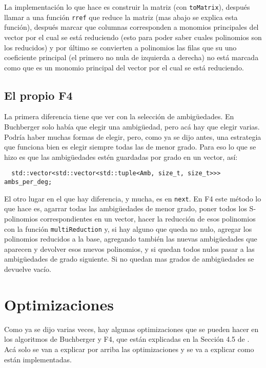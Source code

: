 \documentclass{report}
\theoremstyle{customstyle}
\theoremstyle{factstyle}
\begin{document}
La implementación lo que hace es construir la matriz (con \texttt{toMatrix}), después llamar a una función \texttt{rref} que reduce la matriz (mas abajo se explica esta función), después marcar que columnas corresponden a monomios principales del vector por el cual se está reduciendo (esto para poder saber cuales polinomios son los reducidos) y por último se convierten a polinomios las filas que su uno coeficiente principal (el primero no nula de izquierda a derecha) no está marcada como que es un monomio principal del vector por el cual se está reduciendo.

\subsection{El propio F4}

La primera diferencia tiene que ver con la selección de ambigüedades. En Buchberger solo había que elegir una ambigüedad, pero acá hay que elegir varias. Podría haber muchas formas de elegir, pero, como ya se dijo antes, una estrategia que funciona bien es elegir siempre todas las de menor grado. Para eso lo que se hizo es que las ambigüedades estén guardadas por grado en un vector, así:

\begin{verbatim}
  std::vector<std::vector<std::tuple<Amb, size_t, size_t>>> ambs_per_deg;
\end{verbatim}

El otro lugar en el que hay diferencia, y mucha, es en \texttt{next}. En F4 este método lo que hace es, agarrar todas las ambigüedades de menor grado, poner todos los S-polinomios correspondientes en un vector, hacer la reducción de esos polinomios con la función \texttt{multiReduction} y, si hay alguno que queda no nulo, agregar los polinomios reducidos a la base, agregando también las nuevas ambigüedades que aparecen y devolver esos nuevos polinomios, y si quedan todos nulos pasar a las ambigüedades de grado siguiente. Si no quedan mas grados de ambigüedades se devuelve vacío.

\section{Optimizaciones}\label{secton:optimizaciones}

Como ya se dijo varias veces, hay algunas optimizaciones que se pueden hacer en los algoritmos de Buchberger y F4, que están explicadas en la Sección 4.5 de \cite{thesis:Hof20}. Acá solo se van a explicar por arriba las optimizaciones y se va a explicar como están implementadas.
\end{document}
